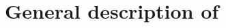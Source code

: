 \documentclass[a4paper,12pt]{article}
\begin{document}
\section{General description of }
\end{document}

